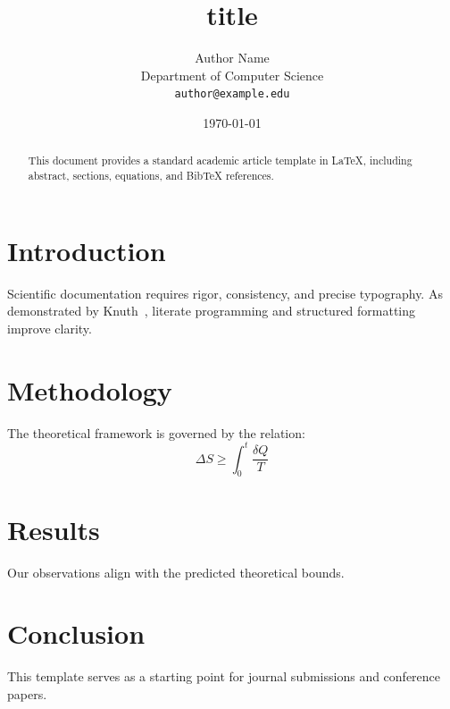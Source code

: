 \documentclass[11pt,a4paper]{article}
\title{{{title}}}
\author{Author Name\\Department of Computer Science\\\texttt{author@example.edu}}
\date{\today}
\begin{document}
\maketitle

\begin{abstract}
This document provides a standard academic article template in \LaTeX, including abstract, sections, equations, and BibTeX references.
\end{abstract}

\section{Introduction}

Scientific documentation requires rigor, consistency, and precise typography. As demonstrated by Knuth~\cite{knuth1984}, literate programming and structured formatting improve clarity.

\section{Methodology}

The theoretical framework is governed by the relation:
\begin{equation}
\Delta S \ge \int_0^t \frac{\delta Q}{T}
\end{equation}

\section{Results}

Our observations align with the predicted theoretical bounds.

\section{Conclusion}

This template serves as a starting point for journal submissions and conference papers.



\end{document}
